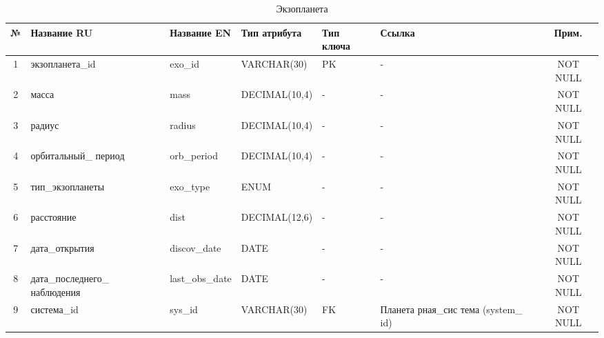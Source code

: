 \documentclass[14pt,a4paper]{extarticle}
\begin{document}
	\begin{table}[H]
    \centering
    \caption{Экзопланета}
    \small
    \begin{tabular}{|c|p{3.2cm}|p{2.6cm}|p{2.8cm}|p{1.5cm}|p{1.5cm}|c|}
\hline
№ & Название RU & Название EN & Тип атрибута & Тип ключа & Ссылка & Прим. \\
\hline
1 & экзопланета\_id & exo\_id & VARCHAR(30) & PK & - & NOT NULL \\
2 & масса & mass & DECIMAL(10,4) & - & - & NOT NULL \\
3 & радиус & radius & DECIMAL(10,4) & - & - & NOT NULL \\
4 & орбитальный\_ период & orb\_period & DECIMAL(10,4) & - & - & NOT NULL \\
5 & тип\_экзопланеты & exo\_type & ENUM & - & - & NOT NULL \\
6 & расстояние & dist & DECIMAL(12,6) & - & - & NOT NULL \\
7 & дата\_открытия & discov\_date & DATE & - & - & NOT NULL \\
8 & дата\_последнего\_ наблюдения & last\_obs\_date & DATE & - & - & NOT NULL \\
9 & система\_id & sys\_id & VARCHAR(30) & FK & Планета рная\_сис тема (system\_ id) & NOT NULL \\
\hline
\end{tabular}
\end{table}
\end{document}
